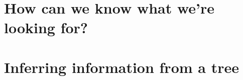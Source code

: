 \documentclass[aspectratio=169]{beamer}
\begin{document}
\begin{frame}
\begin{columns}
    \end{columns}

\end{frame}

\section{How can we know what we're looking for?}


\section{Inferring information from a tree}
\end{document}
